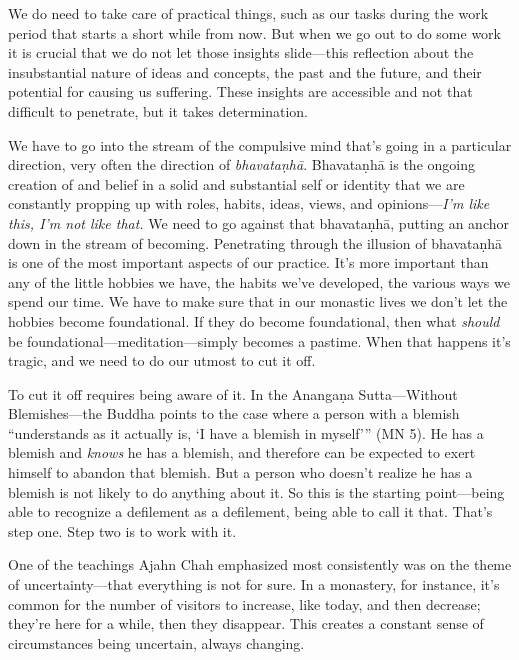 We do need to take care of practical things, such as our tasks during 
the work period that starts a short while from now. But when we go out 
to do some work it is crucial that we do not let those insights 
slide---this reflection about the insubstantial nature of ideas and 
concepts, the past and the future, and their potential for causing us 
suffering. These insights are accessible and not that difficult to 
penetrate, but it takes determination.

We have to go into the stream of the compulsive mind that's going in a 
particular direction, very often the direction of \emph{bhavataṇhā}. 
Bhavataṇhā is the ongoing creation of and belief in a solid and 
substantial self or identity that we are constantly propping up with 
roles, habits, ideas, views, and opinions---\emph{I'm like this, I'm 
not like that.} We need to go against that bhavataṇhā, putting an 
anchor down in the stream of becoming. Penetrating through the illusion 
of bhavataṇhā is one of the most important aspects of our practice. 
It's more important than any of the little hobbies we have, the habits 
we've developed, the various ways we spend our time. We have to make 
sure that in our monastic lives we don't let the hobbies become 
foundational. If they do become foundational, then what \emph{should} 
be foundational---meditation---simply becomes a pastime. When that 
happens it's tragic, and we need to do our utmost to cut it off.

To cut it off requires being aware of it. In the Anangaṇa 
Sutta---Without Blemishes---the Buddha points to the case where a 
person with a blemish ``understands as it actually is, `I have a 
blemish in myself'\thinspace'' (MN 5). He has a blemish and 
\emph{knows} he has a blemish, and therefore can be expected to exert 
himself to abandon that blemish. But a person who doesn't realize he 
has a blemish is not likely to do anything about it. So this is the 
starting point---being able to recognize a defilement as a defilement, 
being able to call it that. That's step one. Step two is to work with 
it.


One of the teachings Ajahn Chah emphasized most consistently was on the 
theme of uncertainty---that everything is not for sure. In a monastery, 
for instance, it's common for the number of visitors to increase, like 
today, and then decrease; they're here for a while, then they 
disappear. This creates a constant sense of circumstances being 
uncertain, always changing.

